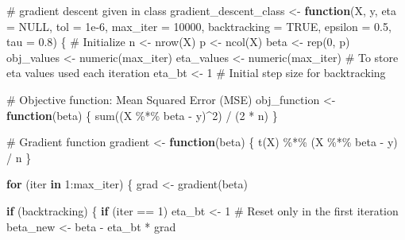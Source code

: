 \documentclass[
  letterpaper,
  DIV=11,
  numbers=noendperiod]{scrartcl}
\newenvironment{Shaded}{\begin{snugshade}}{\end{snugshade}}
\newcommand{\AttributeTok}[1]{\textcolor[rgb]{0.40,0.45,0.13}{#1}}
\newcommand{\CommentTok}[1]{\textcolor[rgb]{0.37,0.37,0.37}{#1}}
\newcommand{\ConstantTok}[1]{\textcolor[rgb]{0.56,0.35,0.01}{#1}}
\newcommand{\ControlFlowTok}[1]{\textcolor[rgb]{0.00,0.23,0.31}{\textbf{#1}}}
\newcommand{\DecValTok}[1]{\textcolor[rgb]{0.68,0.00,0.00}{#1}}
\newcommand{\FloatTok}[1]{\textcolor[rgb]{0.68,0.00,0.00}{#1}}
\newcommand{\FunctionTok}[1]{\textcolor[rgb]{0.28,0.35,0.67}{#1}}
\newcommand{\NormalTok}[1]{\textcolor[rgb]{0.00,0.23,0.31}{#1}}
\newcommand{\OtherTok}[1]{\textcolor[rgb]{0.00,0.23,0.31}{#1}}
\newcommand{\SpecialCharTok}[1]{\textcolor[rgb]{0.37,0.37,0.37}{#1}}
\begin{document}
\begin{Shaded}
\begin{Highlighting}[]
\CommentTok{\# gradient descent given in class}
\NormalTok{gradient\_descent\_class }\OtherTok{\textless{}{-}} \ControlFlowTok{function}\NormalTok{(X, y, }\AttributeTok{eta =} \ConstantTok{NULL}\NormalTok{, }\AttributeTok{tol =} \FloatTok{1e{-}6}\NormalTok{, }\AttributeTok{max\_iter =} \DecValTok{10000}\NormalTok{, }\AttributeTok{backtracking =} \ConstantTok{TRUE}\NormalTok{, }\AttributeTok{epsilon =} \FloatTok{0.5}\NormalTok{, }\AttributeTok{tau =} \FloatTok{0.8}\NormalTok{) \{}
  \CommentTok{\# Initialize}
\NormalTok{  n }\OtherTok{\textless{}{-}} \FunctionTok{nrow}\NormalTok{(X)}
\NormalTok{  p }\OtherTok{\textless{}{-}} \FunctionTok{ncol}\NormalTok{(X)}
\NormalTok{  beta }\OtherTok{\textless{}{-}} \FunctionTok{rep}\NormalTok{(}\DecValTok{0}\NormalTok{, p)}
\NormalTok{  obj\_values }\OtherTok{\textless{}{-}} \FunctionTok{numeric}\NormalTok{(max\_iter)}
\NormalTok{  eta\_values }\OtherTok{\textless{}{-}} \FunctionTok{numeric}\NormalTok{(max\_iter)  }\CommentTok{\# To store eta values used each iteration}
\NormalTok{  eta\_bt }\OtherTok{\textless{}{-}} \DecValTok{1}  \CommentTok{\# Initial step size for backtracking}
  
  \CommentTok{\# Objective function: Mean Squared Error (MSE)}
\NormalTok{  obj\_function }\OtherTok{\textless{}{-}} \ControlFlowTok{function}\NormalTok{(beta) \{}
    \FunctionTok{sum}\NormalTok{((X }\SpecialCharTok{\%*\%}\NormalTok{ beta }\SpecialCharTok{{-}}\NormalTok{ y)}\SpecialCharTok{\^{}}\DecValTok{2}\NormalTok{) }\SpecialCharTok{/}\NormalTok{ (}\DecValTok{2} \SpecialCharTok{*}\NormalTok{ n)}
\NormalTok{  \}}
  
  \CommentTok{\# Gradient function}
\NormalTok{  gradient }\OtherTok{\textless{}{-}} \ControlFlowTok{function}\NormalTok{(beta) \{}
    \FunctionTok{t}\NormalTok{(X) }\SpecialCharTok{\%*\%}\NormalTok{ (X }\SpecialCharTok{\%*\%}\NormalTok{ beta }\SpecialCharTok{{-}}\NormalTok{ y) }\SpecialCharTok{/}\NormalTok{ n}
\NormalTok{  \}}
  
  \ControlFlowTok{for}\NormalTok{ (iter }\ControlFlowTok{in} \DecValTok{1}\SpecialCharTok{:}\NormalTok{max\_iter) \{}
\NormalTok{    grad }\OtherTok{\textless{}{-}} \FunctionTok{gradient}\NormalTok{(beta)}
    
    \ControlFlowTok{if}\NormalTok{ (backtracking) \{}
      \ControlFlowTok{if}\NormalTok{ (iter }\SpecialCharTok{==} \DecValTok{1}\NormalTok{) eta\_bt }\OtherTok{\textless{}{-}} \DecValTok{1}  \CommentTok{\# Reset only in the first iteration}
\NormalTok{      beta\_new }\OtherTok{\textless{}{-}}\NormalTok{ beta }\SpecialCharTok{{-}}\NormalTok{ eta\_bt }\SpecialCharTok{*}\NormalTok{ grad}
      

\end{Highlighting}
\end{Shaded}
\end{document}
